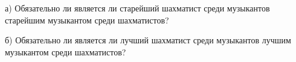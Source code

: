 \begin{thm}
    а) Обязательно ли является ли старейший шахматист среди музыкантов старейшим музыкантом среди шахматистов?
    \par
    б) Обязательно ли является ли лучший шахматист среди музыкантов лучшим музыкантом среди шахматистов?\footnotemark
\end{thm}